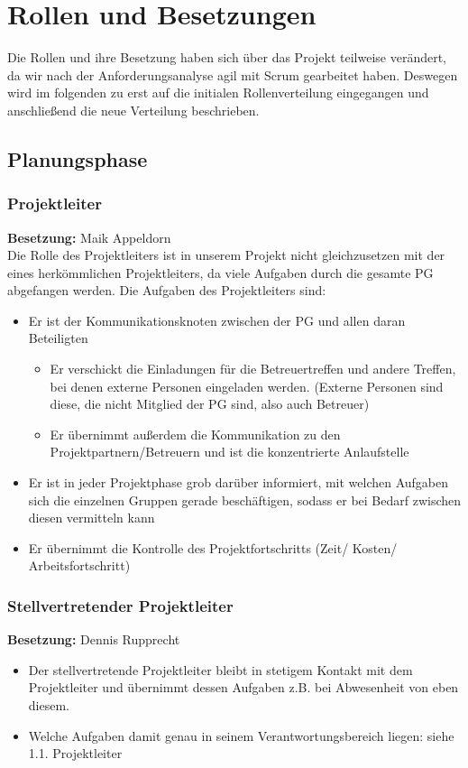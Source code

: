 \section{Rollen und Besetzungen}
Die Rollen und ihre Besetzung haben sich über das Projekt teilweise verändert, da wir nach der Anforderungsanalyse agil mit Scrum gearbeitet haben. Deswegen wird im folgenden zu erst auf die initialen Rollenverteilung eingegangen und anschließend die neue Verteilung beschrieben.

\subsection{Planungsphase}
\subsubsection{Projektleiter} 
\textbf{Besetzung:} Maik Appeldorn \\
Die Rolle des Projektleiters ist in unserem Projekt nicht gleichzusetzen mit der eines herkömmlichen Projektleiters, da viele Aufgaben durch die gesamte PG abgefangen werden.
Die Aufgaben des Projektleiters sind:
\begin{itemize}
	\item Er ist der Kommunikationsknoten zwischen der PG und allen daran Beteiligten
	\begin{itemize}
		\item Er verschickt die Einladungen für die Betreuertreffen und andere Treffen, bei denen externe Personen eingeladen werden. (Externe Personen sind diese, die nicht Mitglied der PG sind, also auch Betreuer)
		\item Er übernimmt außerdem die Kommunikation zu den Projektpartnern/Betreuern und ist die konzentrierte Anlaufstelle
	\end{itemize}	
	\item Er ist in jeder Projektphase grob darüber informiert, mit welchen Aufgaben sich die einzelnen Gruppen gerade beschäftigen, sodass er bei Bedarf zwischen diesen vermitteln kann
	\item Er übernimmt die Kontrolle des Projektfortschritts (Zeit/ Kosten/ Arbeitsfortschritt)
\end{itemize}

\subsubsection{Stellvertretender Projektleiter}
\textbf{Besetzung:} Dennis Rupprecht \\
\begin{itemize}
	\item Der stellvertretende Projektleiter bleibt in stetigem Kontakt mit dem Projektleiter und übernimmt dessen Aufgaben z.B. bei Abwesenheit von eben diesem.
	\item Welche Aufgaben damit genau in seinem Verantwortungsbereich liegen: siehe 1.1. Projektleiter
\end{itemize}


